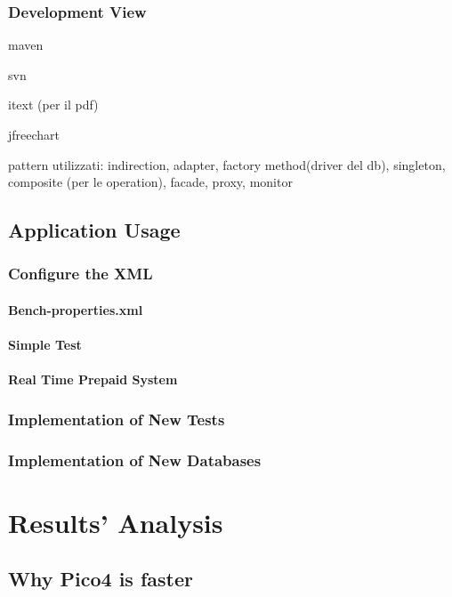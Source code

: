 		\subsection{Development View}
		
		maven
		
		svn
		
		itext (per il pdf)
		
		jfreechart
		
		pattern utilizzati: indirection, adapter, factory method(driver del db), singleton, 
		composite (per le operation), facade, proxy, monitor
	
	\section{Application Usage}
		\subsection{Configure the XML}
			\subsubsection{Bench-properties.xml}
			\subsubsection{Simple Test}
			\subsubsection{Real Time Prepaid System}
			
		\subsection{Implementation of New Tests}%
		\subsection{Implementation of New Databases}%


\chapter{Results' Analysis}
	\section{Why Pico4 is faster}
